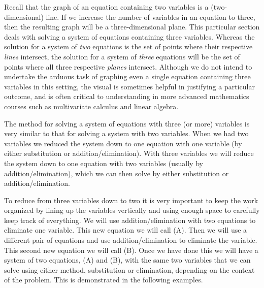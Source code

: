 {}\pp

Recall that the graph of an equation containing two variables is a (two-dimensional) line.  If we increase the number of variables in an equation to three, then the resulting graph will be a three-dimensional plane.  This particular section deals with solving a system of equations containing three variables.  Whereas the solution for a system of \textit{two} equations is the set of points where their respective \textit{lines} intersect, the solution for a system of \textit{three} equations will be the set of points where all three respective \textit{planes} intersect.  Although we do not intend to undertake the arduous task of graphing even a single equation containing three variables in this setting, the visual is sometimes helpful in justifying a particular outcome, and is often critical to understanding in more advanced mathematics courses such as multivariate calculus and linear algebra.\pp

The method for solving a system of equations with three (or more) variables is very similar to that for solving a system with two variables. When we had two variables we reduced the system
down to one equation with one variable (by either substitution or addition/elimination). With three
variables we will reduce the system down to one equation with two variables (usually by
addition/elimination), which we can then solve by either substitution or addition/elimination.\pp

To reduce from three variables down to two it is very important to keep the
work organized by lining up the variables vertically and using enough space to carefully keep track of everything. We will use addition/elimination with two equations to eliminate one
variable. This new equation we will call (A). Then we will use a different
pair of equations and use addition/elimination to eliminate the {}
variable. This second new equation we will call (B). Once we have done this we
will have a system of two equations, (A) and (B), with the same two variables that we can
solve using either method, substitution or elimination, depending on the context of the problem. This is demonstrated in the following examples.

\newpage

